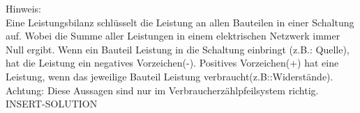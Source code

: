 Hinweis: \\
Eine Leistungsbilanz schl\"usselt die Leistung an allen Bauteilen in einer Schaltung auf. Wobei die Summe aller Leistungen in einem elektrischen Netzwerk immer Null ergibt. Wenn ein Bauteil Leistung in die Schaltung einbringt (z.B.: Quelle), hat die Leistung ein negatives Vorzeichen(-). Positives Vorzeichen(+) hat eine Leistung, wenn das jeweilige Bauteil Leistung verbraucht(z.B::Widerst\"ande). Achtung: Diese Aussagen sind nur im Verbraucherz\"ahlpfeilsystem richtig.
\\

INSERT-SOLUTION 
